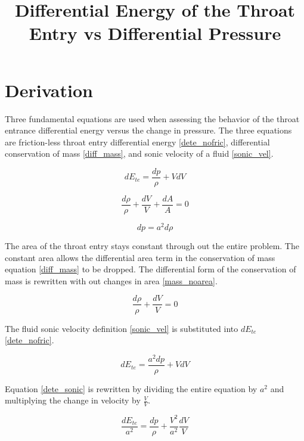 \documentclass{article}
\title{Differential Energy of the Throat Entry vs Differential Pressure}
\begin{document}
\maketitle

\section{Derivation}

Three fundamental equations are used when assessing the behavior of the throat entrance differential energy versus the change in pressure. The three equations are friction-less throat entry differential energy \eqref{dete_nofric}, differential conservation of mass \eqref{diff_mass}, and sonic velocity of a fluid \eqref{sonic_vel}.

\begin{equation}
dE_{te} = \frac{dp}{\rho} + VdV
\label{dete_nofric}
\end{equation}

\begin{equation}
\frac{d\rho}{\rho} + \frac{dV}{V} + \frac{dA}{A} = 0
\label{diff_mass}
\end{equation}

\begin{equation}
dp = a^2d\rho
\label{sonic_vel}
\end{equation}

The area of the throat entry stays constant through out the entire problem. The constant area allows the differential area term in the conservation of mass equation \eqref{diff_mass} to be dropped. The differential form of the conservation of mass is rewritten with out changes in area \eqref{mass_noarea}.

\begin{equation}
\frac{d\rho}{\rho} + \frac{dV}{V} = 0
\label{mass_noarea}
\end{equation}

The fluid sonic velocity definition \eqref{sonic_vel} is substituted into $dE_{te}$ \eqref{dete_nofric}.

\begin{equation}
dE_{te} = \frac{a^{2}dp}{\rho} + VdV
\label{dete_sonic}
\end{equation}

Equation \eqref{dete_sonic} is rewritten by dividing the entire equation by $a^{2}$ and multiplying the change in velocity by $\frac{V}{V}$.

\begin{equation}
\frac{dE_{te}}{a^{2}} = \frac{dp}{\rho} + \frac{V^2}{a^2}\frac{dV}{V}
\label{dete_complex}
\end{equation}
\end{document}
